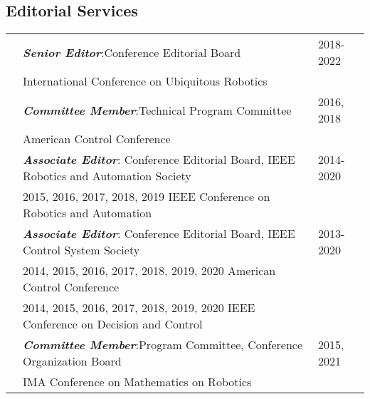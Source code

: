 \documentclass[10pt]{article}
\begin{document}
\vspace*{0.2cm}

\newcommand{\bfi}[1]{\textbf{\textit{#1}}}

\subsection*{Editorial Services}
\begin{tabularx}{\textwidth}{>{\setlength{\hsize}{0.5cm}}X%
>{\setlength{\hsize}{14.3cm}}X%
>{\hfill}X}

& \bfi{Senior Editor}:\quad Conference Editorial Board \quad  & 2018-2022\\
& International Conference on Ubiquitous Robotics & \\[0.2cm]

& \bfi{Committee Member}:\quad Technical Program Committee \quad  & 2016, 2018\\
& American Control Conference & \\[0.2cm]

&\bfi{Associate Editor}: Conference Editorial Board, IEEE Robotics and Automation Society & 2014-2020 \\
& 2015, 2016, 2017, 2018, 2019 IEEE Conference on Robotics and Automation& \\[0.2cm]

&\bfi{Associate Editor}: Conference Editorial Board, IEEE Control System Society & 2013-2020 \\
& 2014, 2015, 2016, 2017, 2018, 2019, 2020 American Control Conference& \\
& 2014, 2015, 2016, 2017, 2018, 2019, 2020 IEEE Conference on Decision and Control& \\[0.2cm]

& \bfi{Committee Member}:\quad Program Committee, Conference Organization Board\quad  & 2015, 2021\\
& IMA Conference on Mathematics on Robotics & \\[0.2cm]

\end{tabularx}

\vspace*{0.2cm}

\end{document}
